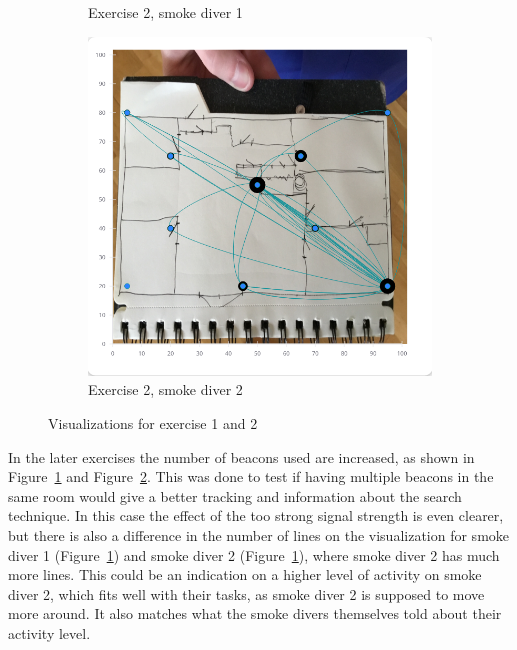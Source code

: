 \documentclass[../Main/thesis.tex]{subfiles}
\begin{document}
\begin{figure}[h]
\begin{subfigure}{0.3\textwidth}
		\caption{Exercise 2, smoke diver 1}
		\label{fig:visualization-2-1}
	\end{subfigure}
	\begin{subfigure}{0.3\textwidth}
		\includegraphics[width=\textwidth]{../fig/eval_2_fredrik}
		\caption{Exercise 2, smoke diver 2}
		\label{fig:visualization-2-2}
	\end{subfigure}
	\caption{Visualizations for exercise 1 and 2}
	\label{fig:eval-visualizations}
\end{figure}

In the later exercises the number of beacons used are increased, as shown in Figure~\ref{fig:visualization-2-1} and Figure~\ref{fig:visualization-2-2}.
This was done to test if having multiple beacons in the same room would give a better tracking and information about the search technique.
In this case the effect of the too strong signal strength is even clearer, but there is also a difference in the number of lines on the visualization for smoke diver 1 (Figure~\ref{fig:visualization-2-1}) and smoke diver 2 (Figure~\ref{fig:visualization-2-1}), where smoke diver 2 has much more lines.
This could be an indication on a higher level of activity on smoke diver 2, which fits well with their tasks, as smoke diver 2 is supposed to move more around.
It also matches what the smoke divers themselves told about their activity level.
\end{document}
